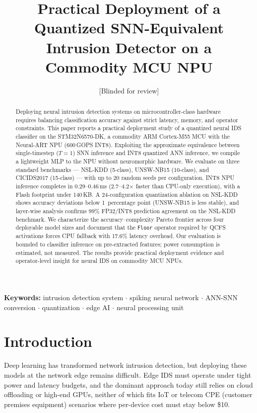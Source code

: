 \documentclass[10pt,twocolumn]{article}
\title{%
  \textbf{Practical Deployment of a Quantized SNN-Equivalent\\
  Intrusion Detector on a Commodity MCU NPU}
}
\author{[Blinded for review]}
\date{}
\begin{document}
\maketitle

\begin{abstract}
Deploying neural intrusion detection systems on microcontroller-class
hardware requires balancing classification accuracy against strict
latency, memory, and operator constraints.
This paper reports a practical deployment study of a quantized neural IDS
classifier on the STM32N6570-DK, a commodity ARM Cortex-M55 MCU with
the Neural-ART NPU (600\,GOPS INT8).
Exploiting the approximate equivalence between single-timestep
($T{=}1$) SNN inference and INT8 quantized ANN inference, we compile
a lightweight MLP to the NPU without neuromorphic hardware.
We evaluate on three standard benchmarks --- NSL-KDD (5-class),
UNSW-NB15 (10-class), and CICIDS2017 (15-class) --- with up to 20
random seeds per configuration.
INT8 NPU inference completes in 0.29--0.46\,ms
(2.7--4.2$\times$ faster than CPU-only execution), with a Flash
footprint under 140\,KB.
A 24-configuration quantization ablation on NSL-KDD shows accuracy
deviations below 1~percentage point (UNSW-NB15 is less stable),
and layer-wise analysis confirms 99\% FP32/INT8 prediction agreement
on the NSL-KDD benchmark.
We characterize the accuracy--complexity Pareto frontier across four
deployable model sizes and document that the \texttt{Floor} operator
required by QCFS activations forces CPU fallback with 17.6\% latency
overhead.
Our evaluation is bounded to classifier inference on pre-extracted
features; power consumption is estimated, not measured.
The results provide practical deployment evidence and operator-level
insight for neural IDS on commodity MCU NPUs.
\end{abstract}

\noindent\textbf{Keywords:}
intrusion detection system $\cdot$
spiking neural network $\cdot$
ANN-SNN conversion $\cdot$
quantization $\cdot$
edge AI $\cdot$
neural processing unit

\section{Introduction}
\label{sec:intro}

Deep learning has transformed network intrusion detection, but deploying
these models at the network edge remains difficult. Edge IDS must operate
under tight power and latency budgets, and the dominant approach today
still relies on cloud offloading or high-end GPUs,
neither of which fits IoT or telecom CPE (customer premises equipment)
scenarios where per-device cost must stay below \$10.
\end{document}

